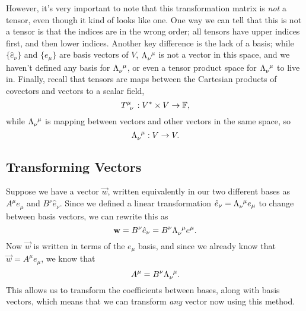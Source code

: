 However, it's very important to note that this transformation matrix is \emph{not} a tensor, even though it kind of looks like one.
One way we can tell that this is not a tensor is that the indices are in the wrong order; all tensors have upper indices first, and then lower indices.
Another key difference is the lack of a basis; while $\{\hat{e}_\nu\}$ and $\{e_\mu\}$ are basis vectors of $V$, $\tensor{\Lambda}{_\nu^\mu}$ is not a vector in this space, and we haven't defined any basis for $\tensor{\Lambda}{_\nu^\mu}$, or even a tensor product space for $\tensor{\Lambda}{_\nu^\mu}$ to live in.
Finally, recall that tensors are maps between the Cartesian products of covectors and vectors to a scalar field,
\[ \tensor{T}{^\mu_\nu} : V^* \times V \to \mathbb{F}, \]
while $\tensor{\Lambda}{_\nu^\mu}$ is mapping between vectors and other vectors in the same space, so 
\[ \tensor{\Lambda}{_\nu^\mu} : V \to V. \]

\subsection{Transforming Vectors}
Suppose we have a vector $\vec{w}$, written equivalently in our two different bases as $A^\mu e_\mu$ and $B^\nu \hat{e}_\nu$.
Since we defined a linear transformation $\hat{e}_\nu = \tensor{\Lambda}{_\nu^\mu} e_\mu$ to change between basis vectors, we can rewrite this as
\[ \vec{w} = B^\nu \hat{e}_\nu = B^\nu \tensor{\Lambda}{_\nu^\mu} e^\mu. \]
Now $\vec{w}$ is written in terms of the $e_\mu$ basis, and since we already know that $\vec{w} = A^\mu e_\mu$, we know that
\[ A^\mu = B^\nu\tensor{\Lambda}{_\nu^\mu}. \]
This allows us to transform the coefficients between bases, along with basis vectors, which means that we can transform \emph{any} vector now using this method.

